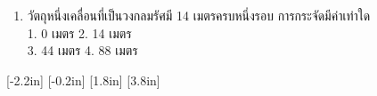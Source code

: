 \documentclass[a4paper,12pt,twoside]{article}
\begin{document}
\begin{enumerate}%
	\item {} วัตถุหนึ่งเคลื่อนที่เป็นวงกลมรัศมี   14  เมตรครบหนึ่งรอบ   การกระจัดมีค่าเท่าใด \\ 
		1.  0  เมตร	\hfill			2.  14  เมตร		\hfill\phantom{xx} \\
		3.  44  เมตร		\hfill		4.  88   เมตร \hfill\phantom{xx}
\vspace{0.8in}
\end{enumerate}

[-2.2in]
[-0.2in]
[1.8in]
[3.8in]
\end{document}
